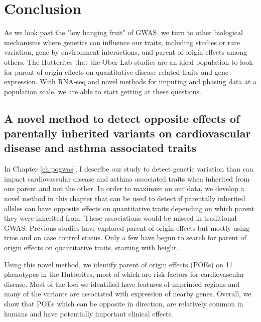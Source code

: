 \chapter{Conclusion}

As we look past the "low hanging fruit" of GWAS, we turn to other biological mechanisms where genetics can influence our traits, including studies or rare variation\cite{Igartua:2017ir}, gene by environment interactions, and parent of origin effects among others. The Hutterites that the Ober Lab studies are an ideal population to look for parent of origin effects on quantitative disease related traits and gene expression\cite{Weiss:2005cq,Abney2001,Ober:2001dy}. With RNA-seq and novel methods for imputing and phasing data at a population scale\citep{Livne2015}, we are able to start getting at these questions. 


\section{A novel method to detect opposite effects of parentally inherited variants on cardiovascular disease and asthma associated traits}
 
 In Chapter \ref{ch:pogwas}, I describe our study to detect genetic variation than can impact cardiovascular disease and asthma associated traits when inherited from one parent and not the other. In order to maximize on our data, we develop a novel method in this chapter that can be used to detect if parentally inherited alleles can have opposite effects on quantitative traits depending on which parent they were inherited from. These associations would be missed in traditional GWAS. Previous studies have explored parent of origin effects but mostly using trios\cite{Garg2012a,Ainsworth:2010bp,Howey:2012hj} and on case control status\cite{Kong:2009kk,Ainsworth:2010bp}. Only a few have begun to search for parent of origin effects on quantitative traits, starting with height\cite{Benonisdottir:2016dz,Zoledziewska:2015do}.
 
Using this novel method, we identify parent of origin effects (POEs) on 11 phenotypes in the Hutterites, most of which are risk factors for cardiovascular disease. Most of the loci we identified have features of imprinted regions and many of the variants are associated with expression of nearby genes. Overall, we show that POEs which can be opposite in direction, are relatively common in humans and have potentially important clinical effects. 
 
